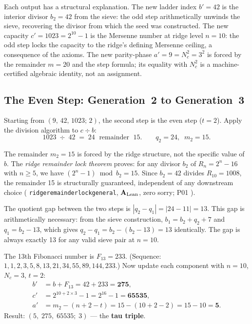 \documentclass[11pt,openany]{book}
\theoremstyle{remark}
\newcommand{\lean}[1]{%
  \penalty-100
  \begingroup\def\_{\textunderscore\allowbreak}\texttt{#1}\endgroup}
\newcommand{\Nc}{N_c}
\newcommand{\CatAL}{\ensuremath{\textbf{A}_{\rm Lean}}}
\begin{document}
Each output has a structural explanation.
The new ladder index $b' = 42$ is the interior divisor $b_2 = 42$ from the sieve: the
odd step arithmetically unwinds the sieve, recovering the divisor from which the seed
was constructed.
The new capacity $c' = 1023 = 2^{10} - 1$ is the Mersenne number at ridge level
$n = 10$: the odd step locks the capacity to the ridge's defining Mersenne ceiling,
a consequence of the axioms.
The new parity-phase $a' = 9 = \Nc^2 = 3^2$ is forced by the remainder $m = 20$
and the step formula; its equality with $\Nc^2$ is a machine-certified algebraic
identity, not an assignment.

\subsection{The Even Step: Generation~2 to Generation~3}
\label{sec:gte_cascade_even}

Starting from $(9,\,42,\,1023;\,2)$, the second step is the even step ($t = 2$).
Apply the division algorithm to $c \div b$:
\[
  1023 \;\div\; 42 \;=\; 24 \;\text{ remainder }\; 15.
  \qquad q_2 = 24,\;\; m_2 = 15.
\]

The remainder $m_2 = 15$ is forced by the ridge structure, not the specific value of $b$.
The \emph{ridge remainder lock theorem} proves: for any divisor $b_2$ of $R_n = 2^n - 16$
with $n \geq 5$, we have $(2^n - 1) \bmod b_2 = 15$.
Since $b_2 = 42$ divides $R_{10} = 1008$, the remainder 15 is structurally guaranteed,
independent of any downstream choice
(\lean{ridge\_remainder\_lock\_general}, \CatAL, zero sorry; P01 \cite{SpivackSM}).

The quotient gap between the two steps is $|q_2 - q_1| = |24 - 11| = 13$.
This gap is arithmetically necessary: from the sieve construction,
$b_1 = b_2 + q_2 + 7$ and $q_1 = b_2 - 13$, which gives
$q_2 - q_1 = b_2 - (b_2 - 13) = 13$ identically.
The gap is always exactly 13 for any valid sieve pair at $n = 10$.

The 13th Fibonacci number is $F_{13} = 233$.
{\small (Sequence: $1, 1, 2, 3, 5, 8, 13, 21, 34, 55, 89, 144, 233$.)}
Now update each component with $n = 10$, $\Nc = 3$, $t = 2$:
\begin{align*}
  b' &= b + F_{13} = 42 + 233 = \mathbf{275}, \\
  c' &= 2^{10 + 2\times 3} - 1 = 2^{16} - 1 = \mathbf{65535}, \\
  a' &= m_2 - (n + 2 - t) = 15 - (10 + 2 - 2) = 15 - 10 = \mathbf{5}.
\end{align*}
Result: $(5,\;275,\;65535;\;3)$ --- the \textbf{tau triple}.
\end{document}
